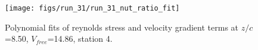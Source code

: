\begin{figure}[H]
\centering
\texttt{[image: figs/run\_31/run\_31\_nut\_ratio\_fit]}
\caption{Polynomial fits of reynolds stress and velocity gradient terms at $z/c$=8.50, $V_{free}$=14.86, station 4.}
\label{fig:run_31_nut_ratio_fit}
\end{figure}



